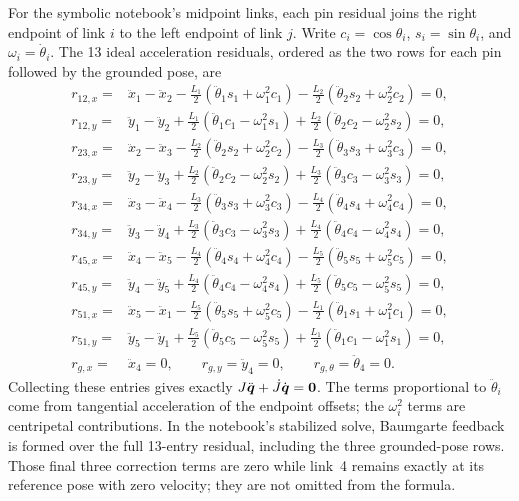 \documentclass[../main.tex]{subfiles}
\begin{document}
For the symbolic notebook's midpoint links, each pin residual joins the right endpoint of link $i$ to the left endpoint of link $j$. Write $c_i=\cos\theta_i$, $s_i=\sin\theta_i$, and $\omega_i=\dot\theta_i$. The 13 ideal acceleration residuals, ordered as the two rows for each pin followed by the grounded pose, are
\begin{equation}
\begin{aligned}
r_{12,x}={}&\ddot x_1-\ddot x_2
-\frac{L_1}{2}(\ddot\theta_1s_1+\omega_1^2c_1)
-\frac{L_2}{2}(\ddot\theta_2s_2+\omega_2^2c_2)=0,\\
r_{12,y}={}&\ddot y_1-\ddot y_2
+\frac{L_1}{2}(\ddot\theta_1c_1-\omega_1^2s_1)
+\frac{L_2}{2}(\ddot\theta_2c_2-\omega_2^2s_2)=0,\\[2pt]
r_{23,x}={}&\ddot x_2-\ddot x_3
-\frac{L_2}{2}(\ddot\theta_2s_2+\omega_2^2c_2)
-\frac{L_3}{2}(\ddot\theta_3s_3+\omega_3^2c_3)=0,\\
r_{23,y}={}&\ddot y_2-\ddot y_3
+\frac{L_2}{2}(\ddot\theta_2c_2-\omega_2^2s_2)
+\frac{L_3}{2}(\ddot\theta_3c_3-\omega_3^2s_3)=0,\\[2pt]
r_{34,x}={}&\ddot x_3-\ddot x_4
-\frac{L_3}{2}(\ddot\theta_3s_3+\omega_3^2c_3)
-\frac{L_4}{2}(\ddot\theta_4s_4+\omega_4^2c_4)=0,\\
r_{34,y}={}&\ddot y_3-\ddot y_4
+\frac{L_3}{2}(\ddot\theta_3c_3-\omega_3^2s_3)
+\frac{L_4}{2}(\ddot\theta_4c_4-\omega_4^2s_4)=0,\\[2pt]
r_{45,x}={}&\ddot x_4-\ddot x_5
-\frac{L_4}{2}(\ddot\theta_4s_4+\omega_4^2c_4)
-\frac{L_5}{2}(\ddot\theta_5s_5+\omega_5^2c_5)=0,\\
r_{45,y}={}&\ddot y_4-\ddot y_5
+\frac{L_4}{2}(\ddot\theta_4c_4-\omega_4^2s_4)
+\frac{L_5}{2}(\ddot\theta_5c_5-\omega_5^2s_5)=0,\\[2pt]
r_{51,x}={}&\ddot x_5-\ddot x_1
-\frac{L_5}{2}(\ddot\theta_5s_5+\omega_5^2c_5)
-\frac{L_1}{2}(\ddot\theta_1s_1+\omega_1^2c_1)=0,\\
r_{51,y}={}&\ddot y_5-\ddot y_1
+\frac{L_5}{2}(\ddot\theta_5c_5-\omega_5^2s_5)
+\frac{L_1}{2}(\ddot\theta_1c_1-\omega_1^2s_1)=0,\\[2pt]
r_{g,x}={}&\ddot x_4=0,\qquad
r_{g,y}=\ddot y_4=0,\qquad
r_{g,\theta}=\ddot\theta_4=0.
\end{aligned}
\label{eq:five-link-expanded-acceleration-residuals}
\end{equation}
Collecting these entries gives exactly $J\ddot{\boldsymbol{q}}+\dot J\dot{\boldsymbol{q}}=\boldsymbol{0}$. The terms proportional to $\ddot\theta_i$ come from tangential acceleration of the endpoint offsets; the $\omega_i^2$ terms are centripetal contributions. In the notebook's stabilized solve, Baumgarte feedback is formed over the full 13-entry residual, including the three grounded-pose rows. Those final three correction terms are zero while link~4 remains exactly at its reference pose with zero velocity; they are not omitted from the formula.
\end{document}

